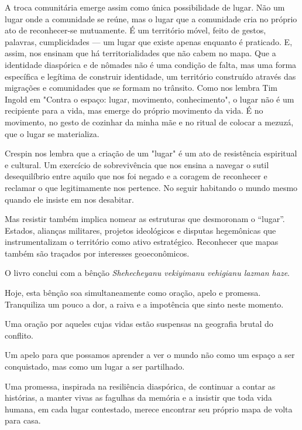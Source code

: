A troca comunitária emerge assim como única possibilidade de lugar. Não
um lugar onde a comunidade se reúne, mas o lugar que a comunidade cria
no próprio ato de reconhecer-se mutuamente. É um território móvel, feito
de gestos, palavras, cumplicidades --- um lugar que existe apenas
enquanto é praticado. E, assim, nos ensinam que há territorialidades que
não cabem no mapa. Que a identidade diaspórica e de nômades não é uma
condição de falta, mas uma forma específica e legítima de construir
identidade, um território construído através das migrações e comunidades
que se formam no trânsito. Como nos lembra Tim Ingold em "Contra o
espaço: lugar, movimento, conhecimento", o lugar não é um recipiente
para a vida, mas emerge do próprio movimento da vida. É no movimento, no
gesto de cozinhar da minha mãe e no ritual de colocar a mezuzá, que o
lugar se materializa.

Crespin nos lembra que a criação de um "lugar" é um ato de resistência
espiritual e cultural. Um exercício de sobrevivência que nos ensina a
navegar o sutil desequilíbrio entre aquilo que nos foi negado e a
coragem de reconhecer e reclamar o que legitimamente nos pertence. No
seguir habitando o mundo mesmo quando ele insiste em nos desabitar.

Mas resistir também implica nomear as estruturas que desmoronam o
``lugar''. Estados, alianças militares, projetos ideológicos e disputas
hegemônicas que instrumentalizam o território como ativo estratégico.
Reconhecer que mapas também são traçados por interesses geoeconômicos.

O livro conclui com a bênção \emph{Shehecheyanu
vekiyimanu vehigianu lazman haze}.

Hoje, esta bênção soa simultaneamente como oração, apelo e promessa.
Tranquiliza um pouco a dor, a raiva e a impotência que sinto neste
momento.

Uma oração por aqueles cujas vidas estão suspensas na geografia brutal
do conflito.

Um apelo para que possamos aprender a ver o mundo não como um espaço a
ser conquistado, mas como um lugar a ser partilhado.

Uma promessa, inspirada na resiliência diaspórica, de continuar a contar
as histórias, a manter vivas as fagulhas da memória e a insistir que
toda vida humana, em cada lugar contestado, merece encontrar seu próprio
mapa de volta para casa.



